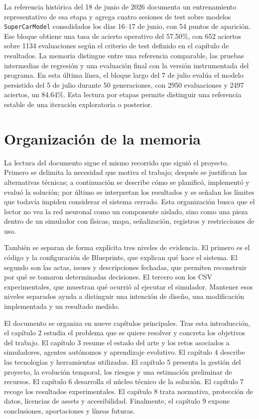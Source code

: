 La referencia histórica del 18 de junio de 2026 documenta un entrenamiento representativo de esa etapa y agrega cuatro sesiones de test sobre modelos \texttt{SuperCarModel} consolidados los días 16--17 de junio, con 54 puntos de aparición. Ese bloque obtiene una tasa de acierto operativo del 57.50\%, con 652 aciertos sobre 1134 evaluaciones según el criterio de test definido en el capítulo de resultados. La memoria distingue entre una referencia comparable, las pruebas intermedias de regresión y una evaluación final con la versión instrumentada del programa. En esta última línea, el bloque largo del 7 de julio evalúa el modelo persistido del 5 de julio durante 50 generaciones, con 2950 evaluaciones y 2497 aciertos, un 84.64\%. Esta lectura por etapas permite distinguir una referencia estable de una iteración exploratoria o posterior.

\section{Organización de la memoria}

La lectura del documento sigue el mismo recorrido que siguió el proyecto. Primero se delimita la necesidad que motiva el trabajo; después se justifican las alternativas técnicas; a continuación se describe cómo se planificó, implementó y evaluó la solución; por último se interpretan los resultados y se señalan los límites que todavía impiden considerar el sistema cerrado. Esta organización busca que el lector no vea la red neuronal como un componente aislado, sino como una pieza dentro de un simulador con físicas, mapa, señalización, registros y restricciones de uso.

También se separan de forma explícita tres niveles de evidencia. El primero es el código y la configuración de Blueprints, que explican qué hace el sistema. El segundo son las actas, issues y descripciones fechadas, que permiten reconstruir por qué se tomaron determinadas decisiones. El tercero son los CSV experimentales, que muestran qué ocurrió al ejecutar el simulador. Mantener esos niveles separados ayuda a distinguir una intención de diseño, una modificación implementada y un resultado medido.

El documento se organiza en nueve capítulos principales. Tras esta introducción, el capítulo 2 estudia el problema que se quiere resolver y concreta los objetivos del trabajo. El capítulo 3 resume el estado del arte y los retos asociados a simuladores, agentes autónomos y aprendizaje evolutivo. El capítulo 4 describe las tecnologías y herramientas utilizadas. El capítulo 5 presenta la gestión del proyecto, la evolución temporal, los riesgos y una estimación preliminar de recursos. El capítulo 6 desarrolla el núcleo técnico de la solución. El capítulo 7 recoge los resultados experimentales. El capítulo 8 trata normativa, protección de datos, licencias de assets y accesibilidad. Finalmente, el capítulo 9 expone conclusiones, aportaciones y líneas futuras.

